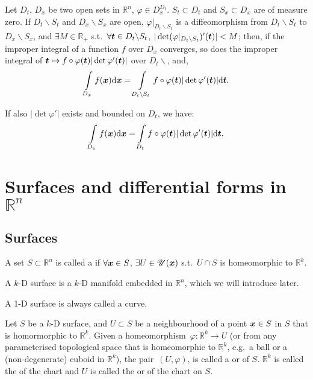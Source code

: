 \documentclass[openany]{book}
\begin{document}
\begin{theorem}
	Let $D_t$, $D_x$ be two open sets in $\mathbb R^n$, $\varphi \in D_x^{D_t}$. 
	$S_t \subset D_t$ and $S_x \subset D_x$ are of measure zero.
	If $D_t \backslash S_t$ and $D_x \backslash S_x$ are open, $\varphi|_{D_t \backslash S_t}$ is a diffeomorphism from $D_t \backslash S_t$ to $D_x \backslash S_x$, and $\exists M \in \mathbb R_+$ s.t.\ $\forall \boldsymbol{t} \in D_t \backslash S_t$, $|\det (\varphi|_{D_t \backslash S_t})'(\boldsymbol{t})| < M$; 
	then, if the improper integral of a function $f$ over $D_x$ converges, so does the improper integral of $\boldsymbol{t} \mapsto f \circ \varphi(\boldsymbol{t}) |\det \varphi'(\boldsymbol{t})|$ over $D_t \backslash$, and, 
	\begin{equation*}
		\int\limits_{D_x} f(\boldsymbol{x}) \mathrm{d} \boldsymbol{x} = \int\limits_{D_t\backslash S_t} f \circ \varphi(\boldsymbol{t}) |\det \varphi'(\boldsymbol{t})| \mathrm{d} \boldsymbol{t}.
	\end{equation*}

	If also $|\det \varphi'|$ exists and bounded on $D_t$, we have:
	\begin{equation*}
		\int\limits_{D_x} f(\boldsymbol{x}) \mathrm{d} \boldsymbol{x} = \int\limits_{D_t} f \circ \varphi(\boldsymbol{t}) |\det \varphi'(\boldsymbol{t})| \mathrm{d} \boldsymbol{t}.
	\end{equation*}
\end{theorem}
\chapter{\texorpdfstring{Surfaces and differential forms in $\mathbb R^n$}{Surfaces and differential forms in Rn}}
\section{Surfaces}
\begin{definition}[$k$-D surface]
	A set $S \subset \mathbb R^n$ is called a  if $\forall \boldsymbol{x} \in S$, $\exists U \in \mathscr U(\boldsymbol{x})$ s.t.\ $U \cap S$ is homeomorphic to $\mathbb R^k$.
\end{definition}

A $k$-D surface is a $k$-D manifold embedded in $\mathbb R^n$, which we will introduce later. 

A 1-D surface is always called a curve. 

\begin{definition}[Chart]
	Let $S$ be a $k$-D surface, and $U \subset S$ be a neighbourhood of a point $\boldsymbol{x} \in S$ in $S$ that is homormorphic to $\mathbb R^k$.
	Given a homeomorphism~$\varphi \colon \mathbb R^k \to U$ (or from any parameterised topological space that is homeomorphic to $\mathbb R^k$, e.g.\ a ball or a (non-degenerate) cuboid in $\mathbb R^k$), the pair~$(U, \varphi)$, is called a  or  of $S$. 
	$\mathbb R^k$ is called the  of the chart and $U$ is called the  or  of the chart on $S$. 
\end{definition}
\end{document}
